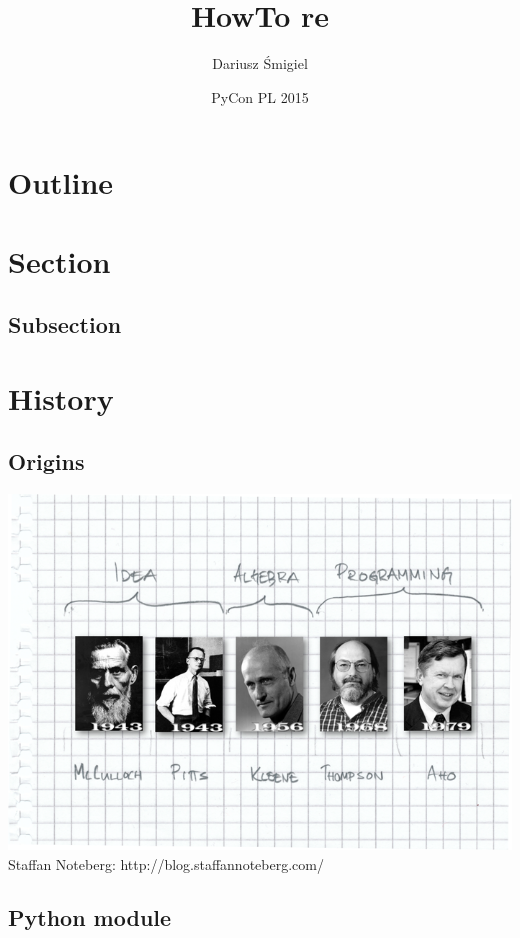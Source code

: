 \documentclass{beamer}
\title{HowTo re}
\author{Dariusz Śmigiel}
\date{PyCon PL 2015}
\begin{document}
\begin{frame}
\titlepage
\end{frame}

\section*{Outline}
\begin{frame}
\tableofcontents
\end{frame}

\section{Section}
\subsection{Subsection}
\begin{frame}
\end{frame}

\section{History}
\subsection{Origins}
\begin{frame}
\includegraphics[width=1\textwidth]{images/history.png}
Staffan Noteberg: http://blog.staffannoteberg.com/
\end{frame}

\subsection{Python module}
\end{document}
